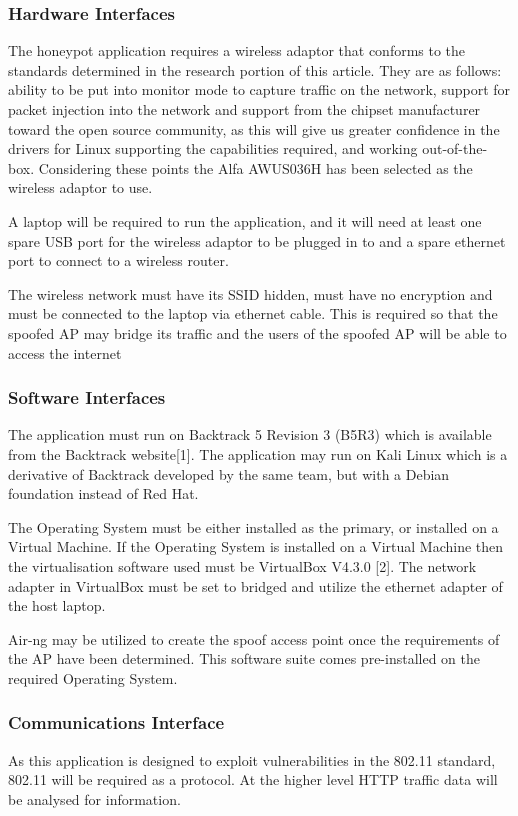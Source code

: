 \subsubsection{Hardware Interfaces}
The honeypot application requires a wireless adaptor that conforms to the standards determined in the research portion of this article. They are as follows: ability to be put into monitor mode to capture traffic on the network, support for packet injection into the network and support from the chipset manufacturer toward the open source community, as this will give us greater confidence in the drivers for Linux supporting the capabilities required, and working out-of-the-box. Considering these points the Alfa AWUS036H has been selected as the wireless adaptor to use.

A laptop will be required to run the application, and it will need at least one spare USB port for the wireless adaptor to be plugged in to and a spare ethernet port to connect to a wireless router.

The wireless network must have its SSID hidden, must have no encryption and must be connected to the laptop via ethernet cable. This is required so that the spoofed AP may bridge its traffic and the users of the spoofed AP will be able to access the internet

\subsubsection{Software Interfaces}
The application must run on Backtrack 5 Revision 3 (B5R3) which is available from the Backtrack website[1]. The application may run on Kali Linux which is a derivative of Backtrack developed by the same team, but with a Debian foundation instead of Red Hat.

The Operating System must be either installed as the primary, or installed on a Virtual Machine. If the Operating System is installed on a Virtual Machine then the virtualisation software used must be VirtualBox V4.3.0 [2]. The network adapter in VirtualBox must be set to bridged and utilize the ethernet adapter of the host laptop.

Air-ng may be utilized to create the spoof access point once the requirements of the AP have been determined. This software suite comes pre-installed on the required Operating System. 

\subsubsection{Communications Interface}
As this application is designed to exploit vulnerabilities in the 802.11 standard, 802.11 will be required as a protocol. At the higher level HTTP traffic data will be analysed for information.

